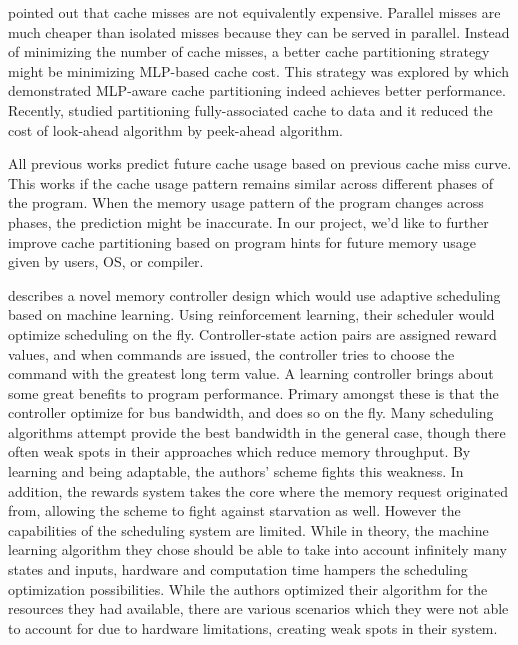 \documentclass{acm_proc_article-sp}
\begin{document}
\cite{Qureshi:2006:CMC:1150019.1136501} pointed out that cache misses are not 
equivalently expensive. Parallel misses are much cheaper than isolated misses 
because they can be served in parallel. Instead of minimizing the number of 
cache misses, a better cache partitioning strategy might be minimizing MLP-based
cache cost. This strategy was explored by \cite{conf/IEEEpact/MoretoCRV07} which
demonstrated MLP-aware cache partitioning indeed achieves better performance.
Recently, \cite{conf/IEEEpact/BeckmannS13} studied partitioning fully-associated
cache to data and it reduced the cost of look-ahead algorithm by peek-ahead 
algorithm.

All previous works predict future cache usage based on previous cache miss 
curve. This works if the cache usage pattern remains similar across different 
phases of the program. When the memory usage pattern of the program changes 
across phases, the prediction might be inaccurate. In our project, we'd like to
further improve cache partitioning based on program hints for future memory 
usage given by users, OS, or compiler.

\cite{Ipek:2008:SMC:1381306.1382172} describes a novel memory controller design
 which would use adaptive 
scheduling based on machine learning. Using reinforcement learning, their 
scheduler would optimize scheduling on the fly. Controller-state action pairs 
are assigned reward values, and when commands are issued, the controller tries 
to choose the command with the greatest long term value. A learning controller 
brings about some great benefits to program performance. Primary amongst these 
is that the controller optimize for bus bandwidth, and does so on the fly. Many 
scheduling algorithms attempt provide the best bandwidth in the general case, 
though there often weak spots in their approaches which reduce memory 
throughput. By learning and being adaptable, the authors’ scheme fights this 
weakness. In addition, the rewards system takes the core where the memory 
request originated from, allowing the scheme to fight against starvation as 
well. However the capabilities of the scheduling system are limited. While in 
theory, the machine learning algorithm they chose should be able to take into 
account infinitely many states and inputs, hardware and computation time hampers
 the scheduling optimization possibilities. While the authors optimized their 
algorithm for the resources they had available, there are various scenarios 
which they were not able to account for due to hardware limitations, creating 
weak spots in their system.
\end{document}
